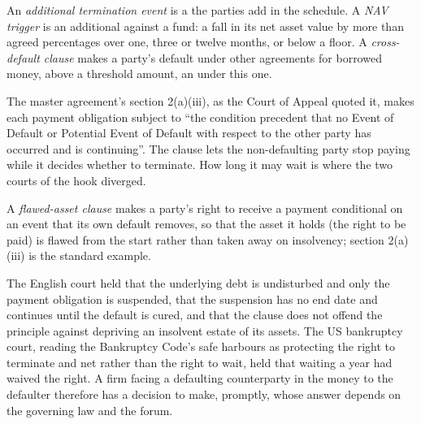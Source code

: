 \begin{definition}\label{def:fm:legal-documentation:ate}
An \emph{additional termination event} is a  the parties add in the schedule. A \emph{NAV
trigger} is an additional  against a fund: a fall in its net asset value by more than agreed percentages over
one, three or twelve months, or below a floor. A \emph{cross-default clause} makes a party's default under other
agreements for borrowed money, above a threshold amount, an  under this one.
\end{definition}

The master agreement's section 2(a)(iii), as the Court of Appeal quoted it, makes each payment obligation subject to ``the condition precedent that
no Event of Default or Potential Event of Default with respect to the other party has occurred and is continuing''. The clause lets the
non-defaulting party stop paying while it decides whether to terminate. How long it may wait is where the two courts of the hook diverged.

\begin{definition}\label{def:fm:legal-documentation:flawed}
A \emph{flawed-asset clause} makes a party's right to receive a payment conditional on an event that its own default
removes, so that the asset it holds (the right to be paid) is flawed from the start rather than taken away on insolvency; section 2(a)(iii) is the
standard example.
\end{definition}

The English court held that the underlying debt is undisturbed and only the payment obligation is suspended, that the suspension has no end date and
continues until the default is cured, and that the clause does not offend the principle against depriving an insolvent estate of its assets. The US
bankruptcy court, reading the Bankruptcy Code's safe harbours as protecting the right to terminate and net rather than the right to wait, held that
waiting a year had waived the right. A firm facing a defaulting counterparty in the money to the defaulter therefore has a decision to make, promptly,
whose answer depends on the governing law and the forum.

